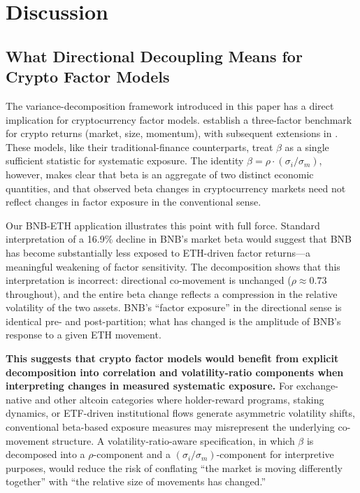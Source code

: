 \documentclass[11pt,a4paper]{article}
\begin{document}
\section{Discussion} \label{sec:disc}

\subsection{What Directional Decoupling Means for Crypto Factor Models}

The variance-decomposition framework introduced in this paper has a direct implication for cryptocurrency factor models. \citet{liu2021} establish a three-factor benchmark for crypto returns (market, size, momentum), with subsequent extensions in \citet{liu2024}. These models, like their traditional-finance counterparts, treat $\beta$ as a single sufficient statistic for systematic exposure. The identity $\beta = \rho \cdot (\sigma_i / \sigma_m)$, however, makes clear that beta is an aggregate of two distinct economic quantities, and that observed beta changes in cryptocurrency markets need not reflect changes in factor exposure in the conventional sense.

Our BNB-ETH application illustrates this point with full force. Standard interpretation of a 16.9\% decline in BNB's market beta would suggest that BNB has become substantially less exposed to ETH-driven factor returns---a meaningful weakening of factor sensitivity. The decomposition shows that this interpretation is incorrect: directional co-movement is unchanged ($\rho \approx 0.73$ throughout), and the entire beta change reflects a compression in the relative volatility of the two assets. BNB's ``factor exposure'' in the directional sense is identical pre- and post-partition; what has changed is the amplitude of BNB's response to a given ETH movement.

\textbf{This suggests that crypto factor models would benefit from explicit decomposition into correlation and volatility-ratio components when interpreting changes in measured systematic exposure.} For exchange-native and other altcoin categories where holder-reward programs, staking dynamics, or ETF-driven institutional flows generate asymmetric volatility shifts, conventional beta-based exposure measures may misrepresent the underlying co-movement structure. A volatility-ratio-aware specification, in which $\beta$ is decomposed into a $\rho$-component and a $(\sigma_i/\sigma_m)$-component for interpretive purposes, would reduce the risk of conflating ``the market is moving differently together'' with ``the relative size of movements has changed.''
\end{document}
